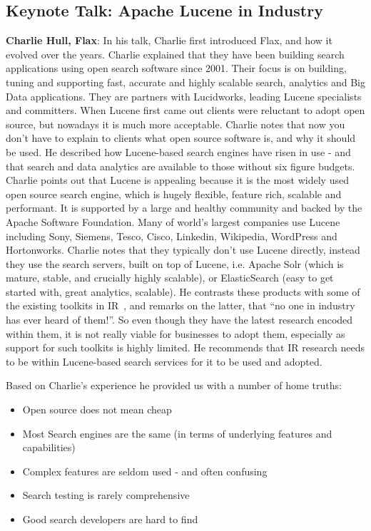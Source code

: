\subsection*{Keynote Talk: Apache Lucene in Industry} 
{\bf Charlie Hull, Flax}: In his talk, Charlie first introduced Flax, and how it evolved over the years. Charlie explained that they have been building search applications using open search software since 2001. Their focus is on building, tuning and supporting fast, accurate and highly scalable search, analytics and Big Data applications. They are partners with Lucidworks, leading Lucene specialists and committers. When Lucene first came out clients were reluctant to adopt open source, but nowadays it is much more acceptable. Charlie notes that now you don't have to explain to clients what open source software is, and why it should be used. He described how Lucene-based search engines have risen in use - and that search and data analytics are available to those without six figure budgets. Charlie points out that Lucene is appealing because it is the most widely used open source search engine, which is hugely flexible, feature rich, scalable and performant. It is supported by a large and healthy community and backed by the Apache Software Foundation. Many of world's largest companies use Lucene including Sony, Siemens, Tesco, Cisco, Linkedin, Wikipedia, WordPress and Hortonworks. Charlie notes that they typically don't use Lucene directly, instead they use the search servers, built on top of Lucene, i.e. Apache Solr (which is mature, stable, and crucially highly scalable), or ElasticSearch (easy to get started with, great analytics, scalable). He contrasts these products with some of the existing toolkits in IR~\cite{Dowie2013,macdonald2012puppy,ogilvie2001experiments,zobel2004zettair}, and remarks on the latter, that ``no one in industry has ever heard of them!''. So even though they have the latest research encoded within them, it is not really viable for businesses to adopt them, especially as support for such toolkits is highly limited. He recommends that IR research needs to be within Lucene-based search services for it to be used and adopted. 


Based on Charlie's experience he provided us with a number of home truths:
\begin{itemize}
	\item Open source does not mean cheap 
	\item Most Search engines are the same (in terms of underlying features and capabilities)
	\item Complex features are seldom used - and often confusing
	\item Search testing is rarely comprehensive
	\item Good search developers are hard to find
\end{itemize}


